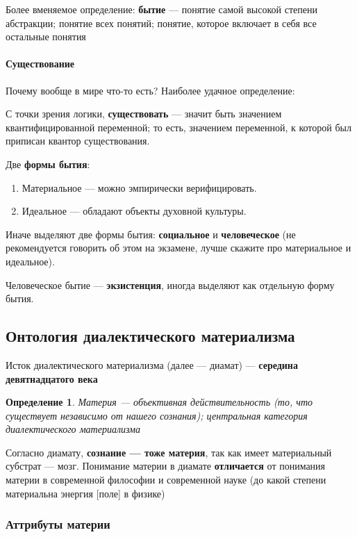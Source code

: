 \documentclass{article}
\newtheorem{definition}{Определение}
\begin{document}
\begin{flushleft}
Более вменяемое определение: \textbf{бытие} — понятие самой высокой степени абстракции; понятие всех понятий; понятие, которое включает в себя все остальные понятия

\paragraph{Существование} Почему вообще в мире что-то есть? Наиболее удачное определение:

С точки зрения логики, \textbf{существовать} — значит быть значением квантифицированной переменной; то есть, значением переменной, к которой был приписан квантор существования.

Две \textbf{формы бытия}:

\begin{enumerate}
    \item Материальное — можно эмпирически верифицировать.
    \item Идеальное — обладают объекты духовной культуры.
\end{enumerate}

Иначе выделяют две формы бытия: \textbf{социальное} и \textbf{человеческое} (не рекомендуется говорить об этом на экзамене, лучше скажите про материальное и идеальное).

Человеческое бытие — \textbf{экзистенция}, иногда выделяют как отдельную форму бытия.

\pagebreak
\subsection{Онтология диалектического материализма}

Исток диалектического материализма (далее — диамат) — \textbf{середина девятнадцатого века}

\begin{definition}
    Материя — объективная действительность (то, что существует независимо от нашего сознания); центральная категория диалектического материализма
\end{definition}

Согласно диамату, \textbf{сознание — тоже материя}, так как имеет материальный субстрат — мозг. Понимание материи в диамате \textbf{отличается} от понимания материи в современной философии и современной науке (до какой степени материальна энергия [поле] в физике)

\subsubsection{Аттрибуты материи}


\end{flushleft}
\end{document}
